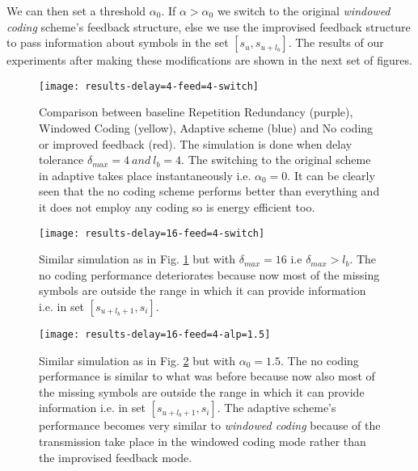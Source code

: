 We can then set a threshold $\alpha_0$. If $\alpha > \alpha_0$ we switch to the original \textit{windowed coding} scheme's feedback structure, else we use the improvised feedback structure to pass information about symbols in the set $[s_{u}, s_{u+l_b}]$. The results of our experiments after making these modifications are shown in the next set of figures.

	
\begin{figure}
	\centering
	\texttt{[image: results-delay=4-feed=4-switch]}
	\caption{Comparison between baseline Repetition Redundancy (purple), Windowed Coding (yellow), Adaptive scheme (blue) and No coding or improved feedback (red). The simulation is done when delay tolerance $\delta_{max}=4\ and\ l_b=4$. The switching to the original scheme in adaptive takes place instantaneously i.e. $\alpha_0 = 0$. It can be clearly seen that the no coding scheme performs better than everything and it does not employ any coding so is energy efficient too.}
	\label{results-feed-1}
\end{figure}

\begin{figure}
	\centering
	\texttt{[image: results-delay=16-feed=4-switch]}
	\caption{Similar simulation as in Fig. \ref{results-feed-1} but with $\delta_{max}=16$ i.e $\delta_{max} > l_b$. The no coding performance deteriorates because now most of the missing symbols are outside the range in which it can provide information i.e. in set $[s_{u+l_b+1}, s_i]$.}
	\label{results-feed-2}
\end{figure}

\begin{figure}[t]
	\centering
	\texttt{[image: results-delay=16-feed=4-alp=1.5]}
	\caption{Similar simulation as in Fig. \ref{results-feed-2} but with $\alpha_0 = 1.5$. The no coding performance is similar to what was before because now also most of the missing symbols are outside the range in which it can provide information i.e. in set $[s_{u+l_b+1}, s_i]$. The adaptive scheme's performance becomes very similar to \textit{windowed coding} because of the transmission take place in the windowed coding mode rather than the improvised feedback mode.\\}
	\label{results-feed-3}
\end{figure}

